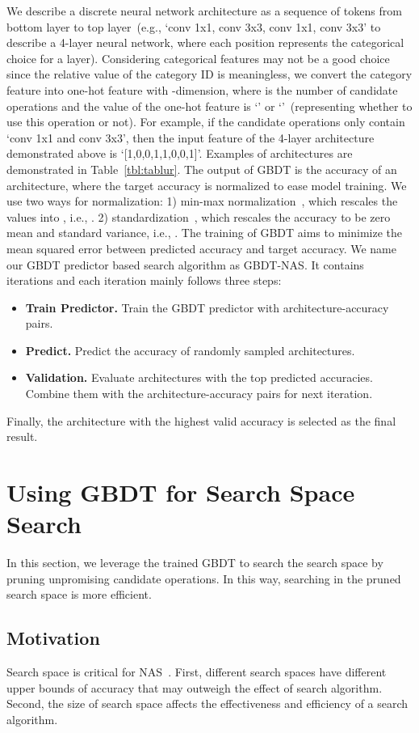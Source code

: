 \documentclass{article}
\begin{document}
We describe a discrete neural network architecture as a sequence of tokens from bottom layer to top layer~(e.g., `conv 1x1, conv 3x3, conv 1x1, conv 3x3' to describe a 4-layer neural network, where each position represents the categorical choice for a layer). Considering categorical features may not be a good choice since the relative value of the category ID is meaningless, we convert the category feature into one-hot feature with -dimension, where  is the number of candidate operations and the value of the one-hot feature is `' or `'~(representing whether to use this operation or not). For example, if the candidate operations only contain `conv 1x1 and conv 3x3', then the input feature of the 4-layer architecture demonstrated above is `[1,0,0,1,1,0,0,1]'. Examples of architectures are demonstrated in Table~\ref{tbl:tablur}. The output of GBDT is the accuracy of an architecture, where the target accuracy is normalized to ease model training. We use two ways for normalization: 1) min-max normalization~\cite{nao}, which rescales the values into , i.e.,  . 2) standardization~\cite{neuralpredictor}, which rescales the accuracy to be zero mean and standard variance, i.e., . The training of GBDT aims to minimize the mean squared error between predicted accuracy and target accuracy. We name our GBDT predictor based search algorithm as GBDT-NAS. It contains  iterations and each iteration mainly follows three steps:
\begin{itemize}
    \item \textbf{Train Predictor.} Train the GBDT predictor with  architecture-accuracy pairs.
    \item \textbf{Predict.} Predict the accuracy of  randomly sampled architectures.
    \item \textbf{Validation.} Evaluate  architectures with the top  predicted accuracies. Combine them with the  architecture-accuracy pairs for next iteration.
\end{itemize}
Finally, the architecture with the highest valid accuracy is selected as the final result.


\section{Using GBDT for Search Space Search}
In this section, we leverage the trained GBDT to search the search space by pruning unpromising candidate operations. In this way, searching in the pruned search space is more efficient.

\subsection{Motivation}
Search space is critical for NAS~\cite{random,rdarts}. First, different search spaces have different upper bounds of accuracy that may outweigh the effect of search algorithm. Second, the size of search space affects the effectiveness and efficiency of a search algorithm. 
\end{document}

